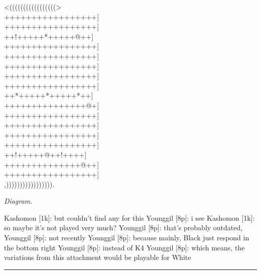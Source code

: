 \documentclass[letterpaper,12pt]{memoir}
\newcounter{GoFigure}[part]
\newcommand{\gofigure}{%
 \stepcounter{GoFigure}
 \centerline{\textit{Diagram.\thinspace\arabic{GoFigure}}}
}
\begin{document}
\begin{minipage}[t]{0.5\textwidth}
{\gnos
<(((((((((((((((((>\\
+++++++++++++++++]\\
+++++++++++++++++]\\
++!+++++*+++++@++]\\
+++++++++++++++++]\\
+++++++++++++++++]\\
+++++++++++++++++]\\
+++++++++++++++++]\\
+++++++++++++++++]\\
++*+++++*+++++*++]\\
+++++++++++++++@+]\\
+++++++++++++++++]\\
+++++++++++++++++]\\
+++++++++++++++++]\\
+++++++++++++++++]\\
++!+++++@++!++++]\\
++++++++++++++@++]\\
+++++++++++++++++]\\
,))))))))))))))))).\\
}
\gofigure
\end{minipage}
\begin{minipage}[t]{0.5\textwidth}
\setlength{\parskip}{0.5em}
Kashomon [1k]: but couldn't find any for this
Younggil [8p]: i see
Kashomon [1k]: so maybe it's not played very much?
Younggil [8p]: that's probably outdated,
Younggil [8p]: not recently
Younggil [8p]: because mainly, Black just respond in the bottom right
Younggil [8p]: instead of K4
Younggil [8p]: which means, the variations from this attachment would be playable for White


\end{minipage}
\vfill

\rule{\textwidth}{0.5pt}
\end{document}
